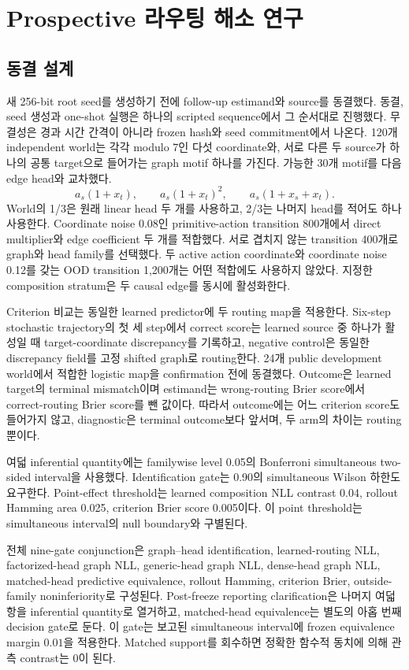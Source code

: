 \section{Prospective 라우팅 해소 연구}
\label{sec:routing-resolution}

\subsection{동결 설계}

새 256-bit root seed를 생성하기 전에 follow-up estimand와 source를 동결했다. 동결,
seed 생성과 one-shot 실행은 하나의 scripted sequence에서 그 순서대로 진행했다.
무결성은 경과 시간 간격이 아니라 frozen hash와 seed commitment에서 나온다. 120개
independent world는 각각 modulo 7인 다섯 coordinate와, 서로 다른 두 source가
하나의 공통 target으로 들어가는 graph motif 하나를 가진다. 가능한 30개 motif를
다음 edge head와 교차했다.
\[
 a_s(1+x_t),\qquad a_s(1+x_t)^2,\qquad
 a_s(1+x_s+x_t).
\]
World의 1/3은 원래 linear head 두 개를 사용하고, 2/3는 나머지 head를 적어도
하나 사용한다. Coordinate noise 0.08인 primitive-action transition 800개에서
direct multiplier와 edge coefficient 두 개를 적합했다. 서로 겹치지 않는 transition
400개로 graph와 head family를 선택했다. 두 active action coordinate와 coordinate
noise 0.12를 갖는 OOD transition 1,200개는 어떤 적합에도 사용하지 않았다.
지정한 composition stratum은 두 causal edge를 동시에 활성화한다.

Criterion 비교는 동일한 learned predictor에 두 routing map을 적용한다. Six-step
stochastic trajectory의 첫 세 step에서 correct score는 learned source 중 하나가
활성일 때 target-coordinate discrepancy를 기록하고, negative control은 동일한
discrepancy field를 고정 shifted graph로 routing한다. 24개 public development
world에서 적합한 logistic map을 confirmation 전에 동결했다. Outcome은 learned
target의 terminal mismatch이며 estimand는 wrong-routing Brier score에서
correct-routing Brier score를 뺀 값이다. 따라서 outcome에는 어느 criterion
score도 들어가지 않고, diagnostic은 terminal outcome보다 앞서며, 두 arm의
차이는 routing뿐이다.

여덟 inferential quantity에는 familywise level 0.05의 Bonferroni simultaneous
two-sided interval을 사용했다. Identification gate는 0.90의 simultaneous Wilson
하한도 요구한다. Point-effect threshold는 learned composition NLL contrast 0.04,
rollout Hamming area 0.025, criterion Brier score 0.005이다. 이 point threshold는
simultaneous interval의 null boundary와 구별된다.

전체 nine-gate conjunction은 graph--head identification, learned-routing NLL,
factorized-head graph NLL, generic-head graph NLL, dense-head graph NLL,
matched-head predictive equivalence, rollout Hamming, criterion Brier,
outside-family noninferiority로 구성된다. Post-freeze reporting clarification은
나머지 여덟 항을 inferential quantity로 열거하고, matched-head equivalence는
별도의 아홉 번째 decision gate로 둔다. 이 gate는 보고된 simultaneous interval에
frozen equivalence margin $0.01$을 적용한다. Matched support를 회수하면 정확한
함수적 동치에 의해 관측 contrast는 0이 된다.

